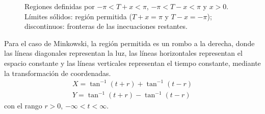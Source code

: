\begin{figure}[H]
  \caption{Regiones definidas por \(-\pi<T+x<\pi\), \(-\pi<T-x<\pi\) y \(x>0\). Límites sólidos: región permitida (\(T+x=\pi\) y \(T-x=-\pi\)); discontinuos: fronteras de las inecuaciones restantes.}
\end{figure}
Para el caso de Minkowski, la región permitida es un rombo a la derecha, donde las líneas diagonales representan la luz, las líneas horizontales representan el espacio constante y las líneas verticales representan el tiempo constante, mediante la transformación de coordenadas.
\begin{equation}
  \begin{aligned}
    X = \tan^{-1}(t+r) + \tan^{-1}(t-r) \\
    Y = \tan^{-1}(t+r) - \tan^{-1}(t-r)
  \end{aligned}
\end{equation}
con el rango $r>0$, $-\infty<t<\infty$.
